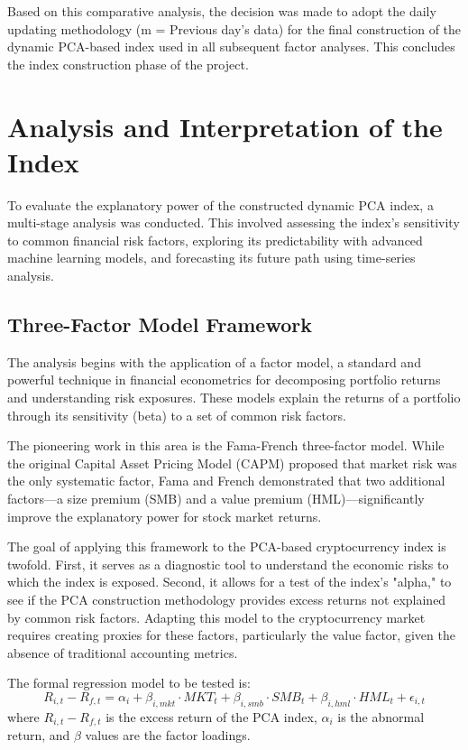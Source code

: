 \documentclass[12pt]{article}
\begin{document}
Based on this comparative analysis, the decision was made to adopt the daily updating methodology (m = Previous day's data) for the final construction of the dynamic PCA-based index used in all subsequent factor analyses. This concludes the index construction phase of the project.


\section{Analysis and Interpretation of the Index}
To evaluate the explanatory power of the constructed dynamic PCA index, a multi-stage analysis was conducted. This involved assessing the index's sensitivity to common financial risk factors, exploring its predictability with advanced machine learning models, and forecasting its future path using time-series analysis.

\subsection{Three-Factor Model Framework}
The analysis begins with the application of a factor model, a standard and powerful technique in financial econometrics for decomposing portfolio returns and understanding risk exposures. These models explain the returns of a portfolio through its sensitivity (beta) to a set of common risk factors.

The pioneering work in this area is the Fama-French three-factor model. While the original Capital Asset Pricing Model (CAPM) proposed that market risk was the only systematic factor, Fama and French demonstrated that two additional factors—a size premium (SMB) and a value premium (HML)—significantly improve the explanatory power for stock market returns.

The goal of applying this framework to the PCA-based cryptocurrency index is twofold. First, it serves as a diagnostic tool to understand the economic risks to which the index is exposed. Second, it allows for a test of the index's "alpha," to see if the PCA construction methodology provides excess returns not explained by common risk factors. Adapting this model to the cryptocurrency market requires creating proxies for these factors, particularly the value factor, given the absence of traditional accounting metrics.

The formal regression model to be tested is:
\[
R_{i,t} - R_{f,t} = \alpha_i + \beta_{i,mkt} \cdot MKT_t + \beta_{i,smb} \cdot SMB_t + \beta_{i,hml} \cdot HML_t + \epsilon_{i,t}
\]
where $R_{i,t} - R_{f,t}$ is the excess return of the PCA index, $\alpha_i$ is the abnormal return, and $\beta$ values are the factor loadings.
\end{document}
